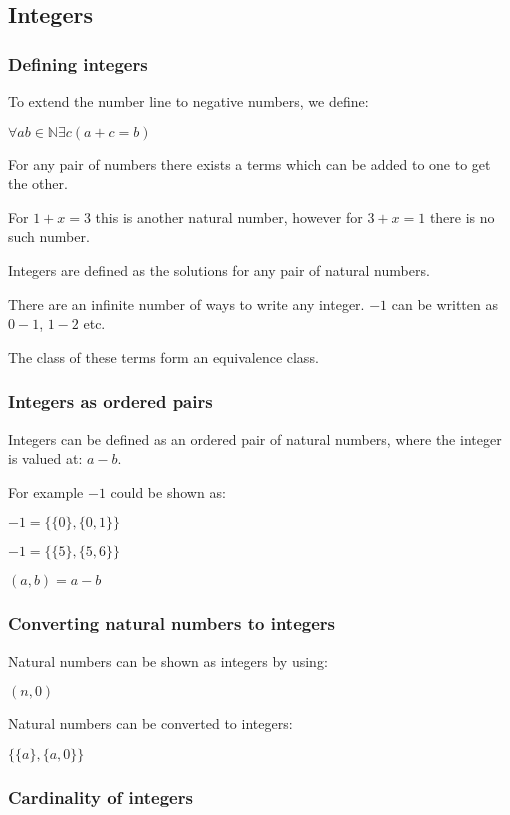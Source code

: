 \subsection{Integers}

\subsubsection{Defining integers}

To extend the number line to negative numbers, we define:

$\forall ab \in \mathbb{N} \exists c (a+c=b)$

For any pair of numbers there exists a terms which can be added to one to get the other.

For \(1+x=3\) this is another natural number, however for \(3+x=1\) there is no such number.

Integers are defined as the solutions for any pair of natural numbers.

There are an infinite number of ways to write any integer. \(-1\) can be written as \(0-1\), \(1-2\) etc.

The class of these terms form an equivalence class.

\subsubsection{Integers as ordered pairs}

Integers can be defined as an ordered pair of natural numbers, where the integer is valued at: \(a-b\).

For example \(-1\) could be shown as:

$-1= \{ \{ 0 \},\{0,1\}\}$

$-1= \{ \{ 5 \},\{5,6\}\}$

$(a,b)=a-b$

\subsubsection{Converting natural numbers to integers}

Natural numbers can be shown as integers by using:

$(n,0)$

Natural numbers can be converted to integers:

$\{\{a\},\{a,0\}\}$
\subsubsection{Cardinality of integers}

